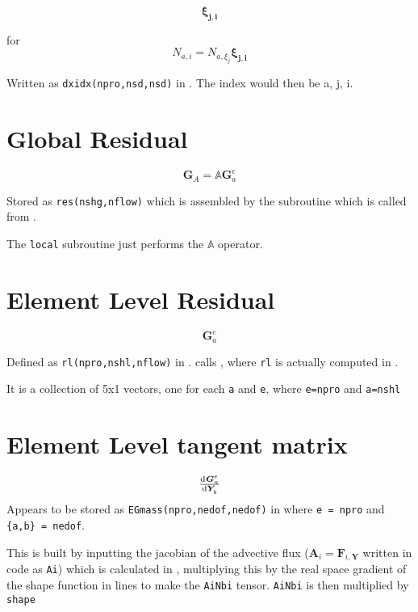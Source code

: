 \documentclass[12pt, letterpaper, twoside]{article}
\renewcommand{\vec}[1]{\bm{#1}}
\newcommand{\ttt}[1]{\texttt{#1}}
\newcommand{\A}{\vec{A}}
\newcommand{\Y}{\vec{Y}}
\newcommand{\F}{\vec{F}}
\newcommand{\G}{\vec{G}}
\newcommand{\0}{\vec{0}}
\begin{document}
\begin{equation}
    \vec{\xi_{j,i}}
\end{equation}

for 
\begin{equation}
    N_{a,i} = N_{a,\xi_j}\vec{\xi_{j,i}}
\end{equation}

Written as \texttt{dxidx(npro,nsd,nsd)} in . The index would then be a, j, i.

\section{Global Residual}
\begin{equation}
    \vec{G}_A = \mathbb{A} \vec{G}^e_a
\end{equation}

Stored as \ttt{res(nshg,nflow)} which is assembled by the subroutine  which is called from .

The \ttt{local} subroutine just performs the \(\mathbb{A}\) operator.

\section{Element Level Residual}

    \begin{equation}
        \vec{G}^e_a
    \end{equation}

    Defined as \texttt{rl(npro,nshl,nflow)} in .  calls , where \ttt{rl} is actually computed in .

    It is a collection of 5x1 vectors, one for each \ttt{a} and \ttt{e}, where \ttt{e=npro} and \ttt{a=nshl}

\section{Element Level tangent matrix}

    \begin{equation}
        \od{\G^e_a}{\Y_b}
    \end{equation}
    Appears to be stored as \ttt{EGmass(npro,nedof,nedof)} in  where \ttt{e = npro} and \ttt{\{a,b\} = nedof}.

    This is built by inputting the jacobian of the advective flux (\(\A_i = \F_{i,\vec{Y}}\) written in code as \ttt{Ai}) which is calculated in , multiplying this by the real space gradient of the shape function in lines  to make the \ttt{AiNbi} tensor. \ttt{AiNbi} is then multiplied by \ttt{shape}
\end{document}
